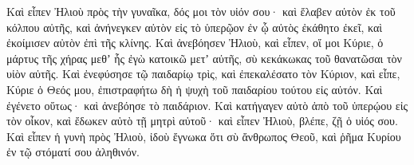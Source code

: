 {\par }{\PP {}Καὶ εἶπεν Ἠλιοὺ πρὸς τὴν γυναῖκα, δός μοι τὸν υἱόν σου· καὶ ἔλαβεν αὐτὸν ἐκ τοῦ κόλπου αὐτῆς, καὶ ἀνήνεγκεν αὐτὸν εἰς τὸ ὑπερῷον ἐν ᾧ αὐτὸς ἐκάθητο ἐκεῖ, καὶ ἐκοίμισεν αὐτὸν ἐπὶ τῆς κλίνης.
Καὶ ἀνεβόησεν Ἠλιοὺ, καὶ εἶπεν, οἵ μοι Κύριε, ὁ μάρτυς τῆς χήρας μεθʼ ἧς ἐγὼ κατοικῶ μετʼ αὐτῆς, σὺ κεκάκωκας τοῦ θανατῶσαι τὸν υἱὸν αὐτῆς.
Καὶ ἐνεφύσησε τῷ παιδαρίῳ τρὶς, καὶ ἐπεκαλέσατο τὸν Κύριον, καὶ εἶπε, Κύριε ὁ Θεός μου, ἐπιστραφήτω δὴ ἡ ψυχὴ τοῦ παιδαρίου τούτου εἰς αὐτόν.
Καὶ ἐγένετο οὕτως· καὶ ἀνεβόησε τὸ παιδάριον.
Καὶ κατήγαγεν αὐτὸ ἀπὸ τοῦ ὑπερῴου εἰς τὸν οἶκον, καὶ ἔδωκεν αὐτὸ τῇ μητρὶ αὐτοῦ· καὶ εἶπεν Ἠλιοὺ, βλέπε, ζῇ ὁ υἱός σου.
Καὶ εἶπεν ἡ γυνὴ πρὸς Ἠλιοὺ, ἰδοὺ ἔγνωκα ὅτι σὺ ἄνθρωπος Θεοῦ, καὶ ῥῆμα Κυρίου ἐν τῷ στόματί σου ἀληθινόν.

}
